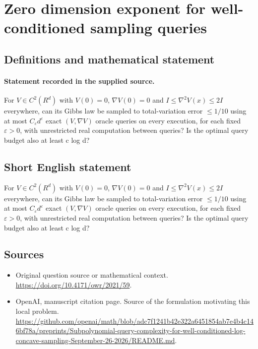 \documentclass[11pt]{article}
\begin{document}
\section*{Zero dimension exponent for well-conditioned sampling queries}\label{30007496}
\subsection{Definitions and mathematical statement}
\paragraph{Statement recorded in the supplied source.}
For $V\in C^{2}(R^d)$ with $V(0)=0$, $\nabla V(0)=0$ and $I\leq \nabla ^{2}V(x)\leq 2I$ everywhere, can its Gibbs law be sampled to total-variation error $\leq 1/10$ using at most $C_\varepsilon d^\varepsilon $ exact $(V,\nabla V)$ oracle queries on every execution, for each fixed $\varepsilon >0$, with unrestricted real computation between queries? Is the optimal query budget also at least c log d?
\subsection{Short English statement}
For $V\in C^{2}(R^d)$ with $V(0)=0$, $\nabla V(0)=0$ and $I\leq \nabla ^{2}V(x)\leq 2I$ everywhere, can its Gibbs law be sampled to total-variation error $\leq 1/10$ using at most $C_\varepsilon d^\varepsilon $ exact $(V,\nabla V)$ oracle queries on every execution, for each fixed $\varepsilon >0$, with unrestricted real computation between queries? Is the optimal query budget also at least c log d?
\subsection{Sources}
\begin{itemize}
\item[S1] Original question source or mathematical context.
\url{https://doi.org/10.4171/owr/2021/59}.
\item[S2] OpenAI, manuscript citation page. Source of the formulation motivating this local problem.
\url{https://github.com/openai/math/blob/adc7f1241b42e322a6451854ab7e4b4c146bf78a/preprints/Subpolynomial-query-complexity-for-well-conditioned-log-concave-sampling-September-26-2026/README.md}.
\end{itemize}
\end{document}
